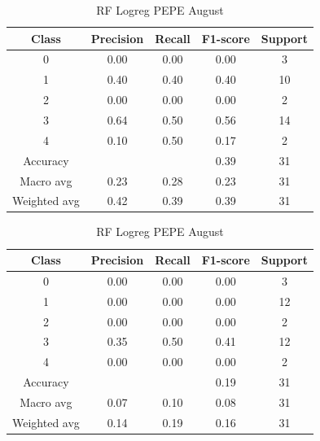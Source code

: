 \begin{enumerate}
\begin{enumerate}
                \begin{table}[H]
                \centering
                \scriptsize
                \begin{minipage}{0.48\textwidth}
                \centering
                \begin{tabular}{c|cccc}
                \hline
                Class & Precision & Recall & F1-score & Support \\
                \hline
                0 & 0.00 & 0.00 & 0.00 & 3 \\
                1 & 0.40 & 0.40 & 0.40 & 10 \\
                2 & 0.00 & 0.00 & 0.00 & 2 \\
                3 & 0.64 & 0.50 & 0.56 & 14 \\
                4 & 0.10 & 0.50 & 0.17 & 2 \\
                \hline
                Accuracy &       &      & 0.39 & 31 \\
                Macro avg & 0.23 & 0.28 & 0.23 & 31 \\
                Weighted avg & 0.42 & 0.39 & 0.39 & 31 \\
                \hline
                \end{tabular}
                \caption{RF Logreg DOGE August}
                \label{tab:classifier_2_report_rf_logreg_doge_non_filtered_aug}
                \end{minipage}
                \hfill
                \begin{minipage}{0.48\textwidth}
                \centering
                \begin{tabular}{c|cccc}
                \hline
                Class & Precision & Recall & F1-score & Support \\
                \hline
                0 & 0.00 & 0.00 & 0.00 & 3 \\
                1 & 0.00 & 0.00 & 0.00 & 12 \\
                2 & 0.00 & 0.00 & 0.00 & 2 \\
                3 & 0.35 & 0.50 & 0.41 & 12 \\
                4 & 0.00 & 0.00 & 0.00 & 2 \\
                \hline
                Accuracy &       &      & 0.19 & 31 \\
                Macro avg & 0.07 & 0.10 & 0.08 & 31 \\
                Weighted avg & 0.14 & 0.19 & 0.16 & 31 \\
                \hline
                \end{tabular}
                \caption{RF Logreg PEPE August}
                \label{tab:classifier_2_report_rf_logreg_pepe_non_filtered_aug}
                \end{minipage}
                

\end{table}
\end{enumerate}
\end{enumerate}

